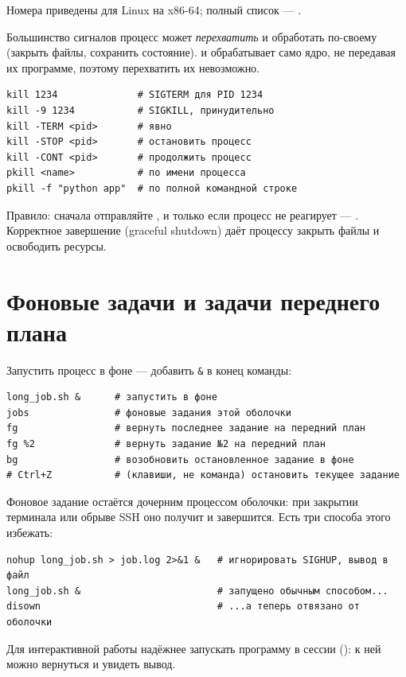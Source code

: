 Номера приведены для Linux на x86-64; полный список ---
.

Большинство сигналов процесс может \emph{перехватить} и
обработать по-своему (закрыть файлы, сохранить состояние).
 и  обрабатывает само ядро, не
передавая их программе, поэтому перехватить их невозможно.

\begin{verbatim}
kill 1234              # SIGTERM для PID 1234
kill -9 1234           # SIGKILL, принудительно
kill -TERM <pid>       # явно
kill -STOP <pid>       # остановить процесс
kill -CONT <pid>       # продолжить процесс
pkill <name>           # по имени процесса
pkill -f "python app"  # по полной командной строке
\end{verbatim}

Правило: сначала отправляйте , и только если процесс не
реагирует --- . Корректное завершение (graceful shutdown) даёт
процессу закрыть файлы и освободить ресурсы.

\section{Фоновые задачи и задачи переднего плана}

Запустить процесс в фоне --- добавить \texttt{\&} в конец
команды:
\begin{verbatim}
long_job.sh &      # запустить в фоне
jobs               # фоновые задания этой оболочки
fg                 # вернуть последнее задание на передний план
fg %2              # вернуть задание №2 на передний план
bg                 # возобновить остановленное задание в фоне
# Ctrl+Z           # (клавиши, не команда) остановить текущее задание
\end{verbatim}

Фоновое задание остаётся дочерним процессом оболочки: при
закрытии терминала или обрыве SSH оно получит  и
завершится. Есть три способа этого избежать:
\begin{verbatim}
nohup long_job.sh > job.log 2>&1 &   # игнорировать SIGHUP, вывод в файл
long_job.sh &                        # запущено обычным способом...
disown                               # ...а теперь отвязано от оболочки
\end{verbatim}
Для интерактивной работы надёжнее запускать программу в
сессии  (): к ней можно
вернуться и увидеть вывод.

